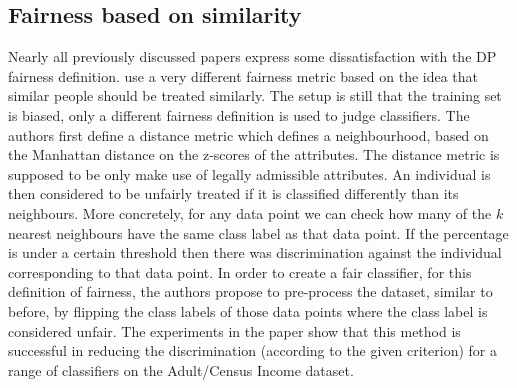 
\subsection{Fairness based on similarity}%
\label{fairness-based-on-similarity}
Nearly all previously discussed papers express some dissatisfaction
with the \acf{DP} fairness definition.
\citet{luong2011k} use a very different fairness metric
based on the idea that similar people should be treated similarly.
The setup is still that the training set is biased,
only a different fairness definition is used to judge classifiers.
The authors first define a distance metric which defines a neighbourhood,
based on the Manhattan distance on the z-scores of the attributes.
The distance metric is supposed to be only make use of legally admissible attributes.
An individual is then considered to be unfairly treated
if it is classified differently than its neighbours.
More concretely, for any data point we can check
how many of the \(k\) nearest neighbours have the same class label as that data point.
If the percentage is under a certain threshold
then there was discrimination against the individual corresponding to that data point.
In order to create a fair classifier, for this definition of fairness,
the authors propose to pre-process the dataset,
similar to \citet{kamiran2009classifying} before,
by flipping the class labels of those data points where the class label is considered unfair.
The experiments in the paper show that this method is successful in reducing the discrimination
(according to the given criterion)
for a range of classifiers on the Adult/Census Income dataset.

